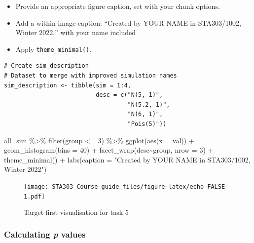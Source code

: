 \documentclass[
  openany]{book}
\newenvironment{Shaded}{\begin{snugshade}}{\end{snugshade}}
\newcommand{\AttributeTok}[1]{\textcolor[rgb]{0.77,0.63,0.00}{#1}}
\newcommand{\DecValTok}[1]{\textcolor[rgb]{0.00,0.00,0.81}{#1}}
\newcommand{\FunctionTok}[1]{\textcolor[rgb]{0.00,0.00,0.00}{#1}}
\newcommand{\NormalTok}[1]{#1}
\newcommand{\SpecialCharTok}[1]{\textcolor[rgb]{0.00,0.00,0.00}{#1}}
\newcommand{\StringTok}[1]{\textcolor[rgb]{0.31,0.60,0.02}{#1}}
\providecommand{\tightlist}{%
  \setlength{\itemsep}{0pt}\setlength{\parskip}{0pt}}
\begin{document}
\begin{itemize}
  \begin{itemize}
  \tightlist
  \item
    Provide an appropriate figure caption, set with your chunk options.
  \item
    Add a within-image caption: ``Created by YOUR NAME in STA303/1002, Winter 2022,'' with your name included
  \item
    Apply \texttt{theme\_minimal()}.
  \end{itemize}
\end{itemize}

\begin{verbatim}
# Create sim_description
# Dataset to merge with improved simulation names
sim_description <- tibble(sim = 1:4, 
                          desc = c("N(5, 1)",
                                   "N(5.2, 1)",
                                   "N(6, 1)",
                                   "Pois(5)"))
\end{verbatim}

\begin{Shaded}
\begin{Highlighting}[]
\NormalTok{all\_sim }\SpecialCharTok{\%\textgreater{}\%} 
  \FunctionTok{filter}\NormalTok{(group }\SpecialCharTok{\textless{}=} \DecValTok{3}\NormalTok{) }\SpecialCharTok{\%\textgreater{}\%}
  \FunctionTok{ggplot}\NormalTok{(}\FunctionTok{aes}\NormalTok{(}\AttributeTok{x =}\NormalTok{ val)) }\SpecialCharTok{+}
  \FunctionTok{geom\_histogram}\NormalTok{(}\AttributeTok{bins =} \DecValTok{40}\NormalTok{) }\SpecialCharTok{+}
  \FunctionTok{facet\_wrap}\NormalTok{(desc}\SpecialCharTok{\textasciitilde{}}\NormalTok{group, }\AttributeTok{nrow =} \DecValTok{3}\NormalTok{) }\SpecialCharTok{+}
  \FunctionTok{theme\_minimal}\NormalTok{() }\SpecialCharTok{+}
  \FunctionTok{labs}\NormalTok{(}\AttributeTok{caption =} \StringTok{"Created by YOUR NAME in STA303/1002, Winter 2022"}\NormalTok{)}
\end{Highlighting}
\end{Shaded}

\begin{figure}
\centering
\texttt{[image: STA303-Course-guide\_files/figure-latex/echo-FALSE-1.pdf]}
\caption{\label{fig:echo-FALSE}Target first visualisation for task 5}
\end{figure}

\hypertarget{calculating-p-values}{%
\subsubsection{\texorpdfstring{Calculating \emph{p} values}{Calculating p values}}\label{calculating-p-values}}
\end{document}
